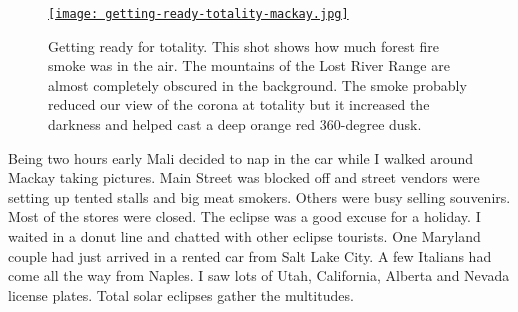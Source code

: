 
\begin{SCfigure}
\centering
\href{https://conceptcontrol.smugmug.com/Places/USA-and-Canada/Idaho-Instants/i-8P2mvsJ/A}{\texttt{[image: getting-ready-totality-mackay.jpg]}}
\caption{Getting ready for totality. This shot shows how much forest fire smoke
was in the air. The mountains of the Lost River Range are almost
completely obscured in the background. The smoke probably reduced our
view of the corona at totality but it increased the darkness and helped
cast a deep orange red 360-degree dusk.}
\label{fig:5430x2}
\end{SCfigure}
 


Being two hours early Mali decided to nap in the car while I walked
around Mackay taking pictures. Main Street was blocked off and street
vendors were setting up tented stalls and big meat smokers. Others were
busy selling souvenirs. Most of the stores were closed. The eclipse was
a good excuse for a holiday. I waited in a donut line and chatted with
other eclipse tourists. One Maryland couple had just arrived in a rented
car from Salt Lake City. A few Italians had come all the way from
Naples. I saw lots of Utah, California, Alberta and Nevada license
plates. Total solar eclipses gather the multitudes.



